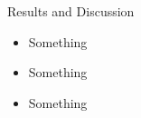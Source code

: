
\begin{frame}{Results and Discussion}
	\begin{itemize}
		\item Something
		\item Something
		\item Something
	\end{itemize}

\end{frame}